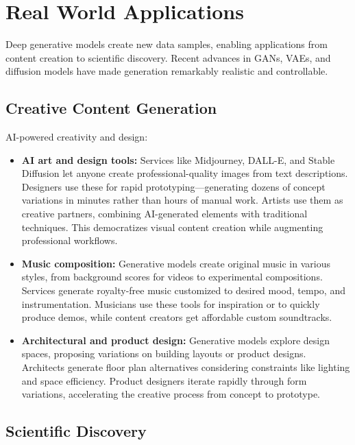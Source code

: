 
\section{Real World Applications}
\label{sec:generative-real-world}

Deep generative models create new data samples, enabling applications from content creation to scientific discovery. Recent advances in GANs, VAEs, and diffusion models have made generation remarkably realistic and controllable.

\subsection{Creative Content Generation}

AI-powered creativity and design:

\begin{itemize}
    \item \textbf{AI art and design tools:} Services like Midjourney, DALL-E, and Stable Diffusion let anyone create professional-quality images from text descriptions. Designers use these for rapid prototyping—generating dozens of concept variations in minutes rather than hours of manual work. Artists use them as creative partners, combining AI-generated elements with traditional techniques. This democratizes visual content creation while augmenting professional workflows.
    
    \item \textbf{Music composition:} Generative models create original music in various styles, from background scores for videos to experimental compositions. Services generate royalty-free music customized to desired mood, tempo, and instrumentation. Musicians use these tools for inspiration or to quickly produce demos, while content creators get affordable custom soundtracks.
    
    \item \textbf{Architectural and product design:} Generative models explore design spaces, proposing variations on building layouts or product designs. Architects generate floor plan alternatives considering constraints like lighting and space efficiency. Product designers iterate rapidly through form variations, accelerating the creative process from concept to prototype.
\end{itemize}

\subsection{Scientific Discovery}

